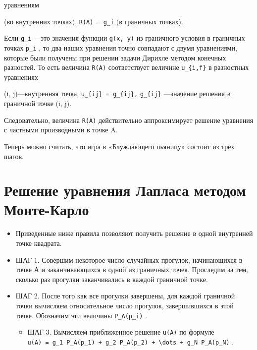 \documentclass[
  ukrainian,
]{article}
\providecommand{\tightlist}{%
  \setlength{\itemsep}{0pt}\setlength{\parskip}{0pt}}
\begin{document}
уравнениям

(во внутренних точках), \texttt{R(A)} = \texttt{g\_i} (в граничных
точках).

Если \texttt{g\_i} ---это значения функции \texttt{g(x,\ y)} из
граничного условия в граничных точках \texttt{p\_i} , то два наших
уравнения точно совпадают с двумя уравнениями, которые были получены при
решении задачи Дирихле методом конечных разностей. То есть величина
\texttt{R(A)} соответствует величине \texttt{u\_\{i,f\}} в разностных
уравнениях

(i, j)---внутренняя точка, \texttt{u\_\{ij\}\ =\ g\_\{ij\},}
\texttt{g\_\{ij\}} ---значение решения в граничной точке (i, j).

Следовательно, величина \texttt{R(A)} действительно аппроксимирует
решение уравнения с частными производными в точке A.

Теперь можно считать, что игра в «Блуждающего пьяницу» состоит из трех
шагов.

\section{Решение уравнения Лапласа методом
Монте-Карло}\label{ux440ux435ux448ux435ux43dux438ux435-ux443ux440ux430ux432ux43dux435ux43dux438ux44f-ux43bux430ux43fux43bux430ux441ux430-ux43cux435ux442ux43eux434ux43eux43c-ux43cux43eux43dux442ux435-ux43aux430ux440ux43bux43e}

\begin{itemize}
\tightlist
\item
  Приведенные ниже правила позволяют получить решение в одной внутренней
  точке квадрата.
\item
  ШАГ 1. Совершим некоторое число случайных прогулок, начинающихся в
  точке А и заканчивающихся в одной из граничных точек. Проследим за
  тем, сколько раз прогулки заканчивались в каждой граничной точке.
\item
  ШАГ 2. После того как все прогулки завершены, для каждой граничной
  точки вычисляем относительное число прогулок, завершившихся в этой
  точке. Обозначим эти величины \texttt{P\_A(p\_i)} .

  \begin{itemize}
  \tightlist
  \item
    ШАГ 3. Вычисляем приближенное решение \texttt{u(A)} по формуле
    \texttt{u(A)\ =\ g\_1\ P\_A(p\_1)\ +\ g\_2\ P\_A(p\_2)\ +\ \textbackslash{}dots\ +\ g\_N\ P\_A(p\_N)}
    ,
  \end{itemize}
\end{itemize}
\end{document}
